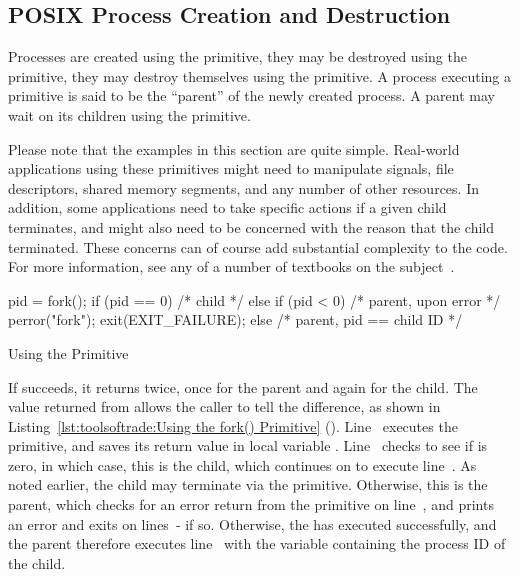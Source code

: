 \subsection{POSIX Process Creation and Destruction}
\label{sec:toolsoftrade:POSIX Process Creation and Destruction}

Processes are created using the  primitive, they may
be destroyed using the  primitive, they may destroy
themselves using the  primitive.
A process executing a  primitive is said to be the ``parent''
of the newly created process.
A parent may wait on its children using the  primitive.

Please note that the examples in this section are quite simple.
Real-world applications using these primitives might need to manipulate
signals, file descriptors, shared memory segments, and any number of
other resources.
In addition, some applications need to take specific actions if a given
child terminates, and might also need to be concerned with the reason
that the child terminated.
These concerns can of course add substantial complexity to the code.
For more information, see any of a number of textbooks on the
subject~\cite{WRichardStevens1992,StewartWeiss2013UNIX}.

\begin{listing}[tbp]
\begin{linelabel}
\begin{VerbatimL}[commandchars=\%\[\]]
pid = fork();%
if (pid == 0) {%
	/* child */%
} else if (pid < 0) {%
	/* parent, upon error */%
	perror("fork");
	exit(EXIT_FAILURE);%
} else {
	/* parent, pid == child ID */%
}
\end{VerbatimL}
\end{linelabel}
\caption{Using the  Primitive}
\label{lst:toolsoftrade:Using the fork() Primitive}
\end{listing}

\begin{lineref}
If  succeeds, it returns twice, once for the parent
and again for the child.
The value returned from  allows the caller to tell
the difference, as shown in
Listing~\ref{lst:toolsoftrade:Using the fork() Primitive}
().
Line~ executes the  primitive, and saves
its return value in local variable .
Line~ checks to see if  is zero, in which case,
this is the child, which continues on to execute line~.
As noted earlier, the child may terminate via the  primitive.
Otherwise, this is the parent, which checks for an error return from
the  primitive on line~, and prints an error
and exits on lines~- if so.
Otherwise, the  has executed successfully, and the parent
therefore executes line~ with the variable 
containing the process ID of the child.
\end{lineref}

